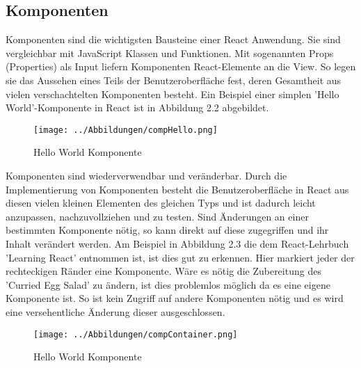 \subsection{Komponenten}
Komponenten sind die wichtigsten Bausteine einer React Anwendung. Sie sind vergleichbar mit JavaScript Klassen und Funktionen. Mit sogenannten Props (Properties) als Input liefern Komponenten React-Elemente an die View. So legen sie das Aussehen eines Teils der Benutzeroberfläche fest, deren Gesamtheit aus vielen verschachtelten Komponenten besteht. Ein Beispiel einer simplen 'Hello World'-Komponente in React ist in Abbildung 2.2 abgebildet.
\begin{figure}[H]
     \centerline{\texttt{[image: ../Abbildungen/compHello.png]}}
  \caption{Hello World Komponente}
  \label{Hello World Komponente}
\end{figure}
Komponenten sind wiederverwendbar und veränderbar. Durch die Implementierung von Komponenten besteht die Benutzeroberfläche in React aus diesen vielen kleinen Elementen des gleichen Typs und ist dadurch leicht anzupassen, nachzuvollziehen und zu testen. Sind Änderungen an einer bestimmten Komponente nötig, so kann direkt auf diese zugegriffen und ihr Inhalt verändert werden. Am Beispiel in Abbildung 2.3 die dem React-Lehrbuch 'Learning React' entnommen ist, ist dies gut zu erkennen. Hier markiert jeder der rechteckigen Ränder eine Komponente. Wäre es nötig die Zubereitung des 'Curried Egg Salad' zu ändern, ist dies problemlos möglich da es eine eigene Komponente ist. So ist kein Zugriff auf andere Komponenten nötig und es wird eine versehentliche Änderung dieser ausgeschlossen.\\
\begin{figure}[H]
     \centerline{\texttt{[image: ../Abbildungen/compContainer.png]}}
  \caption{Hello World Komponente}
  \label{Hello World Komponente}
\end{figure}
